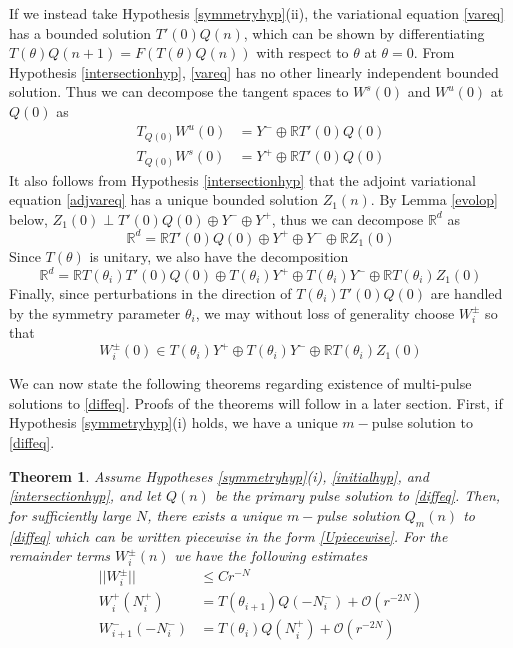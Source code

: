 \documentclass[12pt]{article}
\def\R{{\mathbb R}}
\newtheorem{theorem}{Theorem}
\begin{document}
If we instead take Hypothesis \ref{symmetryhyp}(ii), the variational equation \eqref{vareq} has a bounded solution $T'(0) Q(n)$, which can be shown by differentiating $T(\theta) Q(n+1) = F(T(\theta)Q(n))$ with respect to $\theta$ at $\theta = 0$. From Hypothesis \ref{intersectionhyp}, \eqref{vareq} has no other linearly independent bounded solution. Thus we can decompose the tangent spaces to $W^s(0)$ and $W^u(0)$ at $Q(0)$ as
\begin{align*}
T_{Q(0)} W^u(0) &= Y^- \oplus \R T'(0) Q(0) \\
T_{Q(0)} W^s(0) &= Y^+ \oplus \R T'(0) Q(0)
\end{align*}
It also follows from Hypothesis \ref{intersectionhyp} that the adjoint variational equation \eqref{adjvareq} has a unique bounded solution $Z_1(n)$. By Lemma \ref{evolop} below, $Z_1(0) \perp T'(0) Q(0) \oplus Y^- \oplus Y^+$, thus we can decompose $\R^d$ as
\begin{equation}\label{nontdecomp}
\R^d = \R T'(0) Q(0) \oplus Y^+ \oplus Y^- \oplus \R Z_1(0)
\end{equation}
Since $T(\theta)$ is unitary, we also have the decomposition
\begin{equation}\label{nontdecompT}
\R^d = \R T(\theta_i) T'(0) Q(0) \oplus T(\theta_i) Y^+ \oplus T(\theta_i) Y^- \oplus \R T(\theta_i) Z_1(0)
\end{equation}
Finally, since perturbations in the direction of $T(\theta_i) T'(0) Q(0)$ are handled by the symmetry parameter $\theta_i$, we may without loss of generality choose $W_i^\pm$ so that 
\begin{equation}\label{W0loc}
W_i^\pm(0) \in T(\theta_i) Y^+ \oplus T(\theta_i) Y^- \oplus \R T(\theta_i) Z_1(0)
\end{equation}

We can now state the following theorems regarding existence of multi-pulse solutions to \eqref{diffeq}. Proofs of the theorems will follow in a later section. First, if Hypothesis \ref{symmetryhyp}(i) holds, we have a unique $m-$pulse solution to \eqref{diffeq}.

\begin{theorem}\label{transversemulti}
Assume Hypotheses \ref{symmetryhyp}(i), \ref{initialhyp}, and \ref{intersectionhyp}, and let $Q(n)$ be the primary pulse solution to \eqref{diffeq}. Then, for sufficiently large $N$, there exists a unique $m-$pulse solution $Q_m(n)$ to \eqref{diffeq} which can be written piecewise in the form \eqref{Upiecewise}. For the remainder terms $W_i^\pm(n)$ we have the following estimates
\begin{equation}\label{Westimates}
\begin{aligned}
||W_i^\pm|| &\leq C r^{-N} \\
W_i^+(N_i^+) &= T(\theta_{i+1}) Q(-N_i^-) + \mathcal{O}(r^{-2N}) \\
W_{i+1}^-(-N_i^-) &= T(\theta_i) Q(N_i^+) + \mathcal{O}(r^{-2N})
\end{aligned}
\end{equation}
\end{theorem}
\end{document}
